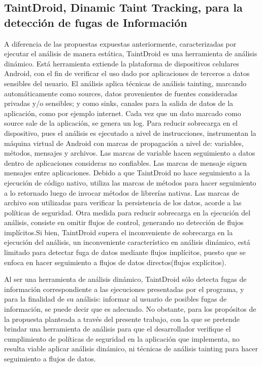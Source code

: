 \subsection{TaintDroid, Dinamic Taint Tracking, para la detección de fugas de
Información}
\label{subsec:TaintDroid-Tool}
A diferencia de las propuestas expuestas anteriormente, caracterizadas
por ejecutar el análisis de manera estática, TaintDroid es una herramienta de
análisis dinámico. Está herramienta extiende la plataforma de dispositivos
celulares Android, con el fin de verificar el uso dado por aplicaciones de
terceros a datos sensibles del usuario. El análisis aplica técnicas de análisis
tainting, marcando automáticamente como sources, datos provenientes de fuentes
consideradas privadas y/o sensibles; y como sinks, canales para la salida de
datos de la aplicación, como por ejemplo internet.
Cada vez que un dato marcado como source sale de la aplicación, se genera un log.\newline 
Para reducir sobrecarga en el dispositivo, pues el análisis es ejecutado a nivel
de instrucciones, instrumentan la máquina virtual de Android con marcas de
propagación a nivel de: variables, métodos, mensajes y archivos. Las marcas de
variable hacen seguimiento a datos dentro de aplicaciones consideras no
confiables. Las marcas de mensaje siguen mensajes entre aplicaciones. Debido a
que TaintDroid no hace seguimiento a la ejecución de código nativo, utiliza las
marcas de métodos para hacer seguimiento a lo retornado luego de invocar métodos
de librerías nativas. Las marcas de archivo son utilizadas para verificar la
persistencia de los datos, acorde a las políticas de seguridad.\newline
Otra medida para reducir sobrecarga en la ejecución del análisis, consiste en
omitir flujos de control, generando no detección de flujos
implícitos\cite[pag 12]{TaintDroid}.\newline Si bien, TaintDroid supera el inconveniente de sobrecarga en la ejecución del
análisis, un inconveniente característico en análisis dinámico, está limitado
para detectar fuga de datos mediante flujos implícitos, puesto que se
enfoca en hacer seguimiento a flujos de datos directos(flujos
explícitos).

Al ser una herramienta de análisis dinámico, TaintDroid sólo detecta fugas de
información correspondiente a las ejecuciones presentadas por el programa, y
para la finalidad de su análisis: informar al usuario de posibles fugas de
información, se puede decir que es adecuado. No obstante, para los propósitos de
la propuesta planteada a través del presente trabajo, con la que se pretende
brindar una herramienta de análisis para que el desarrollador verifique el
cumplimiento de políticas de seguridad en la aplicación que implementa, no
resulta viable aplicar análisis dinámico, ni técnicas de análisis tainting para
hacer seguimiento a flujos de datos.

